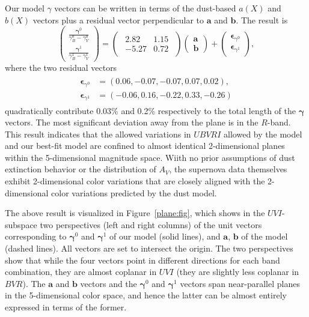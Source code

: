 \documentclass{aastex61}   	%
\begin{document}
Our model $\gamma$ vectors can be written in terms of the 
dust-based $a(X)$ and $b(X)$ vectors plus a residual vector perpendicular to $\mathbf{a}$ and $\mathbf{b}$.
The result is
\begin{equation}
\begin{pmatrix}
 \frac{\pmb{\gamma}^0}{\gamma^0_B-\gamma^0_V} \\
\frac{\pmb{\gamma}^1}{\gamma^1_B-\gamma^1_V} 
\end{pmatrix}=
\begin{pmatrix}
\begin{array}{rr}
2.82 & 1.15  \\
-5.27 & 0.72
\end{array}
\end{pmatrix} 
\begin{pmatrix}
\mathbf{a} \\
\mathbf{b}
\end{pmatrix}+
\begin{pmatrix}
\pmb{\epsilon}_{\gamma^0} \\
\pmb{\epsilon}_{\gamma^1}
\end{pmatrix},
\label{trans_I:eqn}
\end{equation}
where the two residual vectors
\begin{align}
\begin{split}
\pmb{\epsilon}_{\gamma^0} &=(0.06, -0.07, -0.07,  0.07, 0.02), \\
\pmb{\epsilon}_{\gamma^1} & =(-0.06, 0.16, -0.22, 0.33, -0.26)
\end{split}
\label{res_I:eqn}
\end{align}
quadratically contribute  0.03\% and 0.2\% respectively to the total  length of the $\pmb{\gamma}$ vectors.  The most significant
deviation away from the plane is in the $R$-band.
This result indicates that
the allowed variations in $UBVRI$ allowed by the  model and our best-fit model are confined to almost identical
2-dimensional
planes within
the 5-dimensional magnitude space.
Wiith no prior assumptions of dust extinction behavior or the distribution of $A_V$, the supernova data themselves exhibit
2-dimensional color variations that are closely aligned with the 2-dimensional color variations predicted by the  dust model.

The above result is visualized in Figure~\ref{plane:fig}, which  shows  in the $UVI$-subspace two perspectives (left and right columns)
of the unit vectors corresponding to $\pmb{\gamma}^0$ and  $\pmb{\gamma}^1$ of our model (solid lines),
and $\mathbf{a}$, $\mathbf{b}$ of the  model (dashed lines).  All  vectors are set to intersect the origin.
The two perspectives show that while the four vectors point in different directions for each band combination,
they are almost coplanar in $UVI$ (they are slightly less coplanar in $BVR$).  The $\mathbf{a}$ and $\mathbf{b}$ vectors and the $\pmb{\gamma}^0$ and $\pmb{\gamma}^1$
vectors span near-parallel planes in the 5-dimensional color space, and hence the latter can be almost entirely expressed in terms of
the former.
\end{document}
